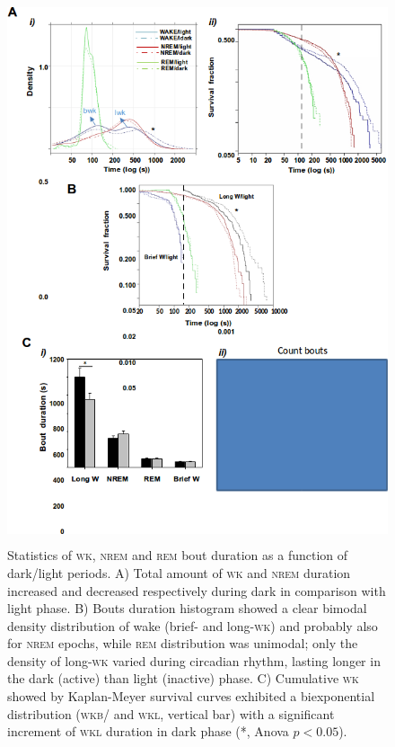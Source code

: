 \documentclass[10pt,letterpaper]{article}
\def\REM/{\textsc{rem}}
\def\NREM/{\textsc{nrem}}
\def\WK/{\textsc{wk}}
\def\WKL/{\textsc{wkl}}
\def\WKB/{\textsc{wkb}}
\begin{document}
\begin{figure}
	\vspace{1.0cm}
\begin{center} 
	\includegraphics[height=16cm]{figuras_plos2.png}
	\caption{Statistics of \WK/, \NREM/ and \REM/ bout duration as a function of dark/light periods. A) Total amount of \WK/ and \NREM/ duration increased and decreased respectively during dark in comparison with light phase. B) Bouts duration histogram showed a clear bimodal density distribution of wake (brief- and long-\WK/) and probably also for \NREM/ epochs, while \REM/ distribution was unimodal; only the density of long-\WK/ varied during circadian rhythm, lasting longer in the dark (active) than light (inactive) phase. C) Cumulative \WK/ showed by Kaplan-Meyer survival curves exhibited a biexponential distribution (\WKB// and \WKL/, vertical bar) with a significant increment of \WKL/ duration in dark phase (*, Anova  $p <0.05$). }
	\label{fig_markov}
\end{center} 
\end{figure}
\end{document}
